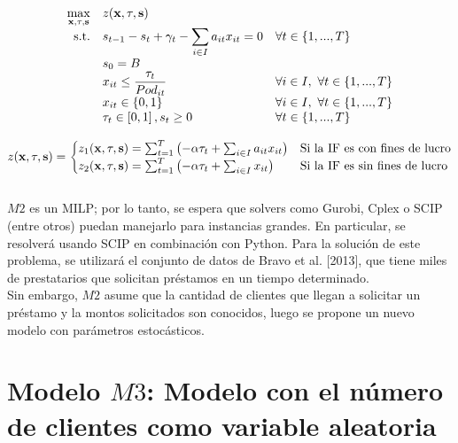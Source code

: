 $$ \begin{array}{r l l}
	\displaystyle\max_{\vb{x}, \tau, \vb{s}} & z(\vb{x}, \tau, \vb{s}) &   									\\
	\text{s.t.}&  s_{t-1} - s_{t} + \gamma_{t} - \displaystyle\sum_{i \in I} a_{it} x_{it} = 0	& \forall t \in \{1,...,T\}		\\
					&  s_{0} = B & 	                                                                                         	\\
					& x_{it} \leq \dfrac{\tau_{t}}{Pod_{it}} & \forall i \in I , \text{  } \forall t \in \{1,...,T\}                 \\
					& x_{it} \in \{0, 1\} & \forall i \in I , \text{  }  \forall t \in \{1,...,T\}                                    \\
					& \tau_{t} \in \left[0,1 \right] , s_{t} \geq 0 & \forall t \in \{1,...,T\}                                            \\
					
\end{array} $$


\[ z(\vb{x}, \tau, \vb{s}) = \begin{cases} z_1(\vb{x}, \tau, \vb{s}) = \sum_{t=1}^{T}\left(- \alpha\tau_t + \sum_{i \in I} a_{it} x_{it}\right) & \text{Si la IF es con fines de lucro} \\ z_2(\vb{x}, \tau, \vb{s}) = \sum_{t=1}^{T} \left(- \alpha\tau_t + \sum_{i \in I} x_{it}\right) & \text{Si la IF es sin fines de lucro} \end{cases} \] \\

$M2$ es un MILP; por lo tanto, se espera que solvers como Gurobi, Cplex o SCIP (entre otros) puedan manejarlo para instancias grandes. En particular, se resolverá usando SCIP en combinación con Python. Para la solución de este problema, se utilizará el conjunto de datos de Bravo et al. [2013], que tiene miles de prestatarios que solicitan préstamos en un tiempo determinado. \\

Sin embargo, $M2$ asume que la cantidad de clientes que llegan a solicitar un préstamo y la montos solicitados son conocidos, luego se propone un nuevo modelo con parámetros estocásticos.

\section{Modelo $M3$: Modelo con el número de clientes como variable aleatoria}

